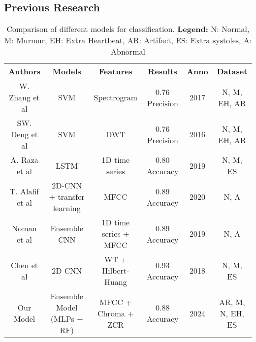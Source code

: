\subsection{Previous Research}


\begin{table*}[ht!]
    \small
    \centering
    \begin{tabular}{|c|c|c|c|c|c|}
        \hline
        \textbf{Authors}                                                                & \textbf{Models}            & \textbf{Features}     & \textbf{Results} & \textbf{Anno} & \textbf{Dataset} \\ \hline
        W. Zhang et al \cite{Zhang_Han_Deng_2017}                                       & SVM                        & Spectrogram           & 0.76 Precision   & 2017          & N, M, EH, AR     \\ \hline
        SW. Deng et al \cite{Deng_Han_2016}                                             & SVM                        & DWT                   & 0.76 Precision   & 2016          & N, M, EH, AR     \\ \hline
        A. Raza et al \cite{Raza_Mehmood_Ullah_Ahmad_Choi_On_2019}                      & LSTM                       & 1D time series        & 0.80 Accuracy    & 2019          & N, M, ES         \\ \hline
        T. Alafif et al \cite{Alafif_Boulares_Barnawi_Alafif_Althobaiti_Alferaidi_2020} & 2D-CNN + transfer learning & MFCC                  & 0.89 Accuracy    & 2020          & N, A             \\ \hline
        Noman et al \cite{Noman_Ting_Salleh_Ombao_2019}                                 & Ensemble CNN               & 1D time series + MFCC & 0.89 Accuracy    & 2019          & N, A             \\ \hline
        Chen et al \cite{Chen_Ren_Hao_Hu_2018}                                          & 2D CNN                     & WT + Hilbert-Huang    & 0.93 Accuracy    & 2018          & N, M, ES         \\ \hline
        Our Model                                                                       & Ensemble Model (MLPs + RF) & MFCC + Chroma + ZCR   & 0.88 Accuracy    & 2024          & AR, M, N, EH, ES \\ \hline
    \end{tabular}
    \caption{Comparison of different models for classification. \textbf{Legend:} N: Normal, M: Murmur, EH: Extra Heartbeat, AR: Artifact, ES: Extra systoles, A: Abnormal}
\end{table*}